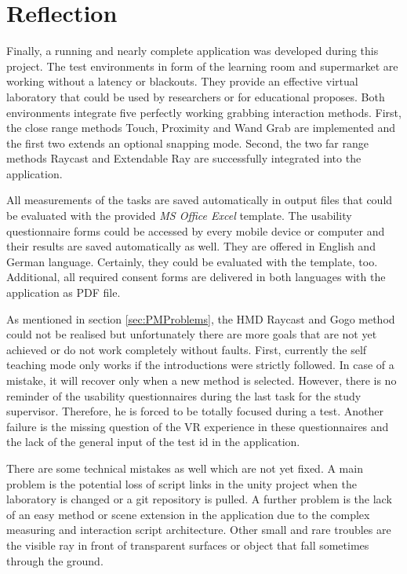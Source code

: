 \section{Reflection} \label{sec:Reflexion}

Finally, a running and nearly complete application was developed during this project.
The test environments in form of the learning room and supermarket are working without a latency or blackouts. They provide an effective virtual laboratory that could be used by researchers or for educational proposes. Both environments integrate five perfectly working grabbing interaction methods. First, the close range methods Touch, Proximity and Wand Grab are implemented and the first two extends an optional snapping mode. Second, the two far range methods Raycast and Extendable Ray are successfully integrated into the application.
 
All measurements of the tasks are saved automatically in output files that could be evaluated with the provided \textit{MS Office Excel} template. The usability questionnaire forms could be accessed by every mobile device or computer and their results are saved automatically as well. They are offered in English and German language. Certainly, they could be evaluated with the template, too. Additional, all required consent forms are delivered in both languages with the application as PDF file.

As mentioned in section \ref{sec:PMProblems}, the HMD Raycast and Gogo method could not be realised but unfortunately there are more goals that are not yet achieved or do not work completely without faults. First, currently the self teaching mode only works if the introductions were strictly followed. In case of a mistake, it will recover only when a new method is selected. However, there is no reminder of the usability questionnaires during the last task for the study supervisor. Therefore, he is forced to be totally focused during a test. Another failure is the missing question of the VR experience in these questionnaires and the lack of the general input of the test id in the application.

There are some technical mistakes as well which are not yet fixed. A main problem is the potential loss of script links in the unity project when the laboratory is changed or a git repository is pulled. A further problem is the lack of an easy method or scene extension in the application due to the complex measuring and interaction script architecture. Other small and rare troubles are the visible ray in front of transparent surfaces or object that fall sometimes through the ground.

\newpage

























